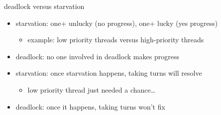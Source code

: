 

\begin{frame}{deadlock versus starvation}
\begin{itemize}
\item starvation: one+ unlucky (no progress), 
                  one+ lucky (yes progress)
    \begin{itemize}
    \item example: low priority threads versus high-priority threads
    \end{itemize}
\item deadlock: no one involved in deadlock makes progress
\vspace{.5cm}
\item<2-> starvation: once starvation happens, taking turns will resolve
    \begin{itemize}
    \item low priority thread just needed a chance\ldots
    \end{itemize}
\item<2-> deadlock: once it happens, taking turns won't fix
\end{itemize}
\end{frame}
